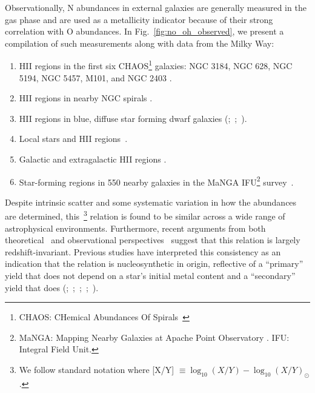 \documentclass[ms.tex]{subfiles}
\begin{document}
Observationally, N abundances in external galaxies are generally measured in
the gas phase and are used as a metallicity indicator because of their strong
correlation with O abundances.
In Fig.~\ref{fig:no_oh_observed}, we present a compilation of such measurements
along with data from the Milky Way:
\begin{enumerate}
	\item[\textbf{1.}] HII regions in the first six CHAOS\footnote{
		CHAOS: CHemical Abundances Of Spirals~\citep{Berg2015}
	} galaxies: NGC 3184, NGC 628, NGC 5194, NGC 5457, M101, and NGC 2403
	\citep{Berg2020, Skillman2020, Rogers2021}.

	\item[\textbf{2.}] HII regions in nearby NGC spirals
	\citep*[][``ONS'' calibration]{Pilyugin2010}.

	\item[\textbf{3.}] HII regions in blue, diffuse star forming dwarf galaxies
	(\citealp{Berg2012};~\citealp*{Izotov2012};~\citealp{James2015}).

	\item[\textbf{4.}] Local stars and HII regions~\citep{Dopita2016}.

	\item[\textbf{5.}] Galactic and extragalactic HII regions
	\citep*{Henry2000}.

	\item[\textbf{6.}] Star-forming regions in 550 nearby galaxies in the
	MaNGA IFU\footnote{
		MaNGA: Mapping Nearby Galaxies at Apache Point Observatory
		\citep{Bundy2015}.
		IFU: Integral Field Unit.
	} survey~\citep{Belfiore2017}.
\end{enumerate}
Despite intrinsic scatter and some systematic variation in how the abundances
are determined, this~\ohno\footnote{
	We follow standard notation where [X/Y]
	$\equiv \log_{10}(X/Y) - \log_{10}(X/Y)_\odot$.
} relation is found to be similar across a wide range of astrophysical
environments.
Furthermore, recent arguments from both theoretical~\mbox{\citep{Vincenzo2018}}
and observational perspectives~\citep{HaydenPawson2021} suggest that this
relation is largely redshift-invariant.
Previous studies have interpreted this consistency as an indication that the
relation is nucleosynthetic in origin, reflective of a ``primary'' yield that
does not depend on a star's initial metal content and a ``secondary'' yield
that does (\citealp{VilaCostas1993};~\citealp*{vanZee1998};~\citealp{Henry1999,
PerezMontero2009};~\citealp*{Pilyugin2012};~\citealp{Andrews2013}).
\end{document}
